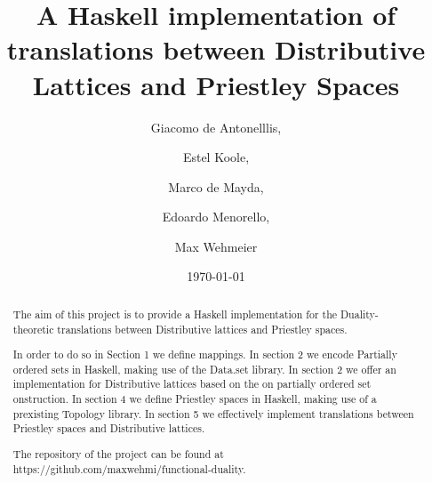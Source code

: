 \documentclass[12pt,a4paper]{article}
\title{A Haskell implementation of translations between Distributive Lattices and Priestley Spaces}
\author{Giacomo de Antonelllis, \and Estel Koole, \and Marco de Mayda, \and  Edoardo Menorello, \and  Max Wehmeier}
\date{\today}
\begin{document}
\maketitle


\begin{abstract}

The aim of this project is to provide a Haskell implementation for the Duality-theoretic translations between Distributive lattices and Priestley spaces.

In order to do so in Section 1 we define mappings. In section 2 we encode Partially ordered sets in Haskell, making use of the Data.set library. In section 2 we offer an implementation for Distributive lattices based on the on partially ordered set onstruction. In section 4 we define Priestley spaces in Haskell, making use of a prexisting Topology library. In section 5 we effectively implement translations between Priestley spaces and Distributive lattices.





The repository of the project can be found at https://github.com/maxwehmi/functional-duality.
\end{abstract}

\vfill

\tableofcontents

\clearpage



















\end{document}
